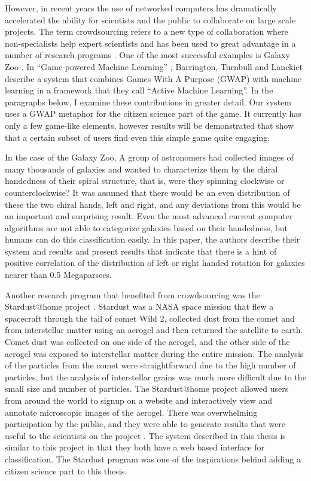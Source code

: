However, in recent years the use of networked computers has
dramatically accelerated the ability for scientists and the public to
collaborate on large scale projects.  The term crowdsourcing refers to
a new type of collaboration where non-specialists help expert
scientists \cite{howe08crowdsourcing} and has been used to great
advantage \cite{surowiecki05crowdsourcing} in a number
\cite{bradham08crowdsourcing} of research programs
\cite{travis08crowdsourcing}.  One of the most successful examples is
Galaxy Zoo \cite{anze08galaxyzoo}.  In ``Game-powered Machine
Learning'' \cite{barrington2012game}, Barrington, Turnbull and
Lanckiet describe a system that combines Games With A Purpose (GWAP)
with machine learning in a framework that they call ``Active Machine
Learning''.  In the paragraphs below, I examine these contributions
in greater detail.  Our system uses a GWAP metaphor for the citizen
science part of the game.  It currently has only a few game-like
elements, however results will be demonstrated that show that a
certain subset of users find even this simple game quite engaging.

In the case of the Galaxy Zoo\cite{anze08galaxyzoo}, A group of
astronomers had collected images of many thousands of galaxies and
wanted to characterize them by the chiral handedness of their spiral
structure, that is, were they spinning clockwise or counterclockwise?
It was assumed that there would be an even distribution of these the
two chiral hands, left and right, and any deviations from this would
be an important and surprising result.  Even the most advanced current
computer algorithms are not able to categorize galaxies based on their
handedness, but humans can do this classification easily.  In this
paper, the authors describe their system and results and present
results that indicate that there is a hint of positive correlation of
the distribution of left or right handed rotation for galaxies nearer
than 0.5 Megaparsecs.

Another research program that benefited from crowdsourcing was the
Stardust@home project \cite{mendez06stardust}.  Stardust
\cite{atkins97stardust} was a NASA space mission that flew a
spacecraft through the tail of comet Wild 2, collected dust from the
comet and from interstellar matter using an aerogel and then returned
the satellite to earth.  Comet dust was collected on one side of the
aerogel, and the other side of the aerogel was exposed to interstellar
matter during the entire mission.  The analysis of the particles from
the comet were straightforward due to the high number of particles,
but the analysis of interstellar grains was much more difficult due to
the small size and number of particles.  The Stardust@home project
allowed users from around the world to signup on a website and
interactively view and annotate microscopic images of the aerogel.
There was overwhelming participation by the public, and they were able
to generate results that were useful to the scientists on the project
\cite{atkins97stardust}.  The system described in this thesis is
similar to this project in that they both have a web based interface
for classification.  The Stardust program was one of the inspirations
behind adding a citizen science part to this thesis.

